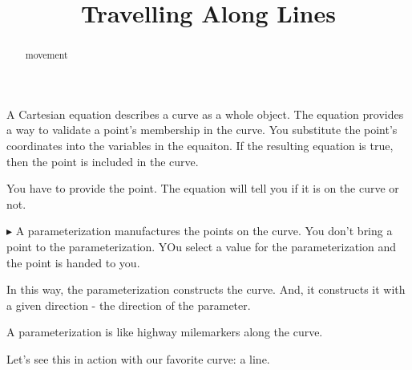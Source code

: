 \documentclass{ximera}
\title{Travelling Along Lines}
\begin{document}
\begin{abstract}
movement
\end{abstract}
\maketitle



A Cartesian equation describes a curve as a whole object.  The equation provides a way to validate a point's membership in the curve. You substitute the point's coordinates into the variables in the equaiton.  If the resulting equation is true, then the point is included in the curve.

You have to provide the point.  The equation will tell you if it is on the curve or not.

$\blacktriangleright$  A parameterization manufactures the points on the curve.  You don't bring a point to the parameterization.  YOu select a value for the parameterization and the point is handed to you.

In this way, the parameterization constructs the curve.  And, it constructs it with a given direction - the direction of the parameter.


A parameterization is like highway milemarkers along the curve.




Let's see this in action with our favorite curve: a line.
\end{document}
